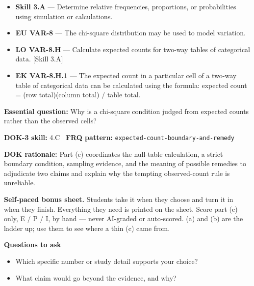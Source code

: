 \documentclass[11pt]{article}
\begin{document}


{\small
\begin{itemize}[leftmargin=1.5em,itemsep=2pt,topsep=2pt]
  \item \textbf{Skill 3.A} --- Determine relative frequencies, proportions, or probabilities using simulation or calculations.
  \item \textbf{EU VAR-8} --- The chi-square distribution may be used to model variation.
  \item \textbf{LO VAR-8.H} --- Calculate expected counts for two-way tables of categorical data. [Skill 3.A]
  \item \textbf{EK VAR-8.H.1} --- The expected count in a particular cell of a two-way table of categorical data can be calculated using the formula: expected count = (row total)(column total) / table total.
\end{itemize}
}
\textbf{Essential question:} Why is a chi-square condition judged from expected counts rather than the observed cells?\par
\textbf{DOK-3 skill:} 4.C \textperiodcentered\ \textbf{FRQ pattern:} {\small\texttt{expected-\allowbreak{}count-\allowbreak{}boundary-\allowbreak{}and-\allowbreak{}remedy}}\par
\textbf{DOK rationale:} Part (c) coordinates the null-table calculation, a strict boundary condition, sampling evidence, and the meaning of possible remedies to adjudicate two claims and explain why the tempting observed-count rule is unreliable.\par

\textbf{Self-paced bonus sheet.} Students take it when they choose and turn it in when they finish. Everything they need is printed on the sheet. Score part (c) only, E / P / I, by hand --- never AI-graded or auto-scored. (a) and (b) are the ladder up; use them to see where a thin (c) came from.\par

\textbf{Questions to ask}
\begin{itemize}[leftmargin=1.5em,itemsep=2pt,topsep=2pt]
  \item Which specific number or study detail supports your choice?
  \item What claim would go beyond the evidence, and why?
\end{itemize}
\end{document}
